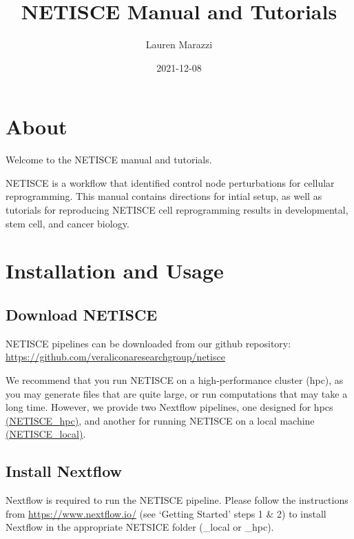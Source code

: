 \documentclass[
]{book}
\title{NETISCE Manual and Tutorials}
\author{Lauren Marazzi}
\date{2021-12-08}
\theoremstyle{definition}
\theoremstyle{definition}
\theoremstyle{definition}
\theoremstyle{definition}
\theoremstyle{remark}
\begin{document}
\maketitle

{
\setcounter{tocdepth}{1}
\tableofcontents
}
\hypertarget{about}{%
\chapter{About}\label{about}}

Welcome to the NETISCE manual and tutorials.

NETISCE is a workflow that identified control node perturbations for cellular reprogramming. This manual contains directions for intial setup, as well as tutorials for reproducing NETISCE cell reprogramming results in developmental, stem cell, and cancer biology.

\hypertarget{installation-and-usage}{%
\chapter{Installation and Usage}\label{installation-and-usage}}

\hypertarget{download-netisce}{%
\section{Download NETISCE}\label{download-netisce}}

NETISCE pipelines can be downloaded from our github repository: \url{https://github.com/veraliconaresearchgroup/netisce}

We recommend that you run NETISCE on a high-performance cluster (hpc), as you may generate files that are quite large, or run computations that may take a long time. However, we provide two Nextflow pipelines, one designed for hpcs \href{https://github.com/VeraLiconaResearchGroup/Netisce/tree/main/NETICSE_hpc}{(NETISCE\_hpc)}, and another for running NETISCE on a local machine \href{https://github.com/VeraLiconaResearchGroup/Netisce/tree/main/NETICSE_local}{(NETISCE\_local)}.

\hypertarget{install-nextflow}{%
\section{Install Nextflow}\label{install-nextflow}}

Nextflow is required to run the NETISCE pipeline. Please follow the instructions from \url{https://www.nextflow.io/} (see `Getting Started' steps 1 \& 2) to install Nextflow in the appropriate NETSICE folder (\_local or \_hpc).
\end{document}
